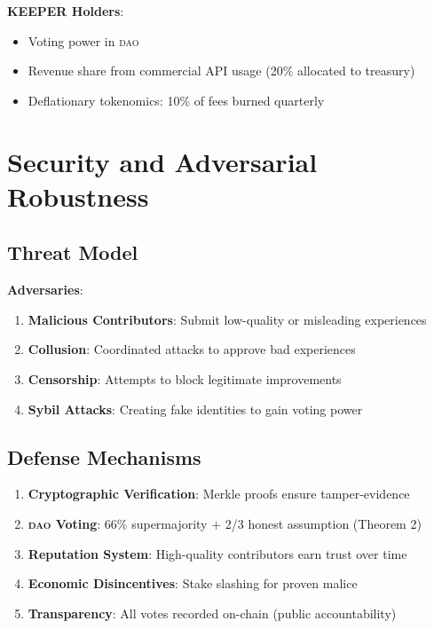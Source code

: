 \documentclass[11pt,letterpaper]{article}
\newcommand{\DAO}{\textsc{dao}}
\begin{document}
\textbf{KEEPER Holders}:
\begin{itemize}
    \item Voting power in \DAO{}
    \item Revenue share from commercial API usage (20\% allocated to treasury)
    \item Deflationary tokenomics: 10\% of fees burned quarterly
\end{itemize}

\section{Security and Adversarial Robustness}

\subsection{Threat Model}

\textbf{Adversaries}:
\begin{enumerate}
    \item \textbf{Malicious Contributors}: Submit low-quality or misleading experiences
    \item \textbf{Collusion}: Coordinated attacks to approve bad experiences
    \item \textbf{Censorship}: Attempts to block legitimate improvements
    \item \textbf{Sybil Attacks}: Creating fake identities to gain voting power
\end{enumerate}

\subsection{Defense Mechanisms}

\begin{enumerate}
    \item \textbf{Cryptographic Verification}: Merkle proofs ensure tamper-evidence
    \item \textbf{\DAO{} Voting}: 66\% supermajority + 2/3 honest assumption (Theorem 2)
    \item \textbf{Reputation System}: High-quality contributors earn trust over time
    \item \textbf{Economic Disincentives}: Stake slashing for proven malice
    \item \textbf{Transparency}: All votes recorded on-chain (public accountability)
\end{enumerate}
\end{document}
